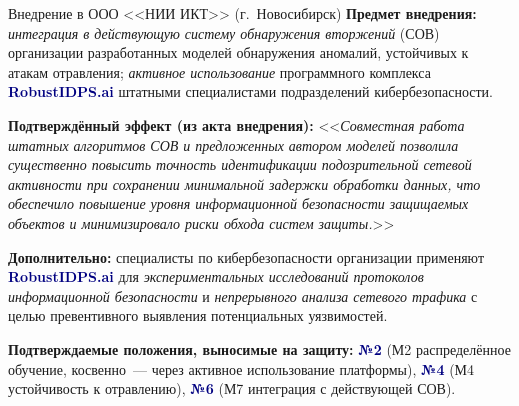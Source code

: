 \documentclass[10pt,aspectratio=169]{beamer}
\newcommand{\bn}[1]{\textcolor{navy}{\textbf{#1}}}
\begin{document}
\begin{frame}{Внедрение в ООО <<НИИ ИКТ>> (г.~Новосибирск)}
\small
\textbf{Предмет внедрения:} \emph{интеграция в действующую
систему обнаружения вторжений} (СОВ) организации разработанных
моделей обнаружения аномалий, устойчивых к атакам отравления;
\emph{активное использование} программного комплекса
\bn{RobustIDPS.ai} штатными специалистами подразделений
кибербезопасности.
\smallskip

\textbf{Подтверждённый эффект (из акта внедрения):}
<<\emph{Совместная работа штатных алгоритмов СОВ и
предложенных автором моделей позволила существенно повысить
точность идентификации подозрительной сетевой активности при
сохранении минимальной задержки обработки данных, что
обеспечило повышение уровня информационной безопасности
защищаемых объектов и минимизировало риски обхода систем
защиты.}>>
\smallskip

\textbf{Дополнительно:} специалисты по кибербезопасности
организации применяют \bn{RobustIDPS.ai} для
\emph{экспериментальных исследований протоколов
информационной безопасности} и \emph{непрерывного анализа
сетевого трафика} с целью превентивного выявления
потенциальных уязвимостей.
\smallskip

\textbf{Подтверждаемые положения, выносимые на защиту:}
\bn{№2} (М2 распределённое обучение, косвенно~--- через
активное использование платформы), \bn{№4} (М4 устойчивость
к отравлению), \bn{№6} (М7 интеграция с действующей СОВ).
\end{frame}
\end{document}
